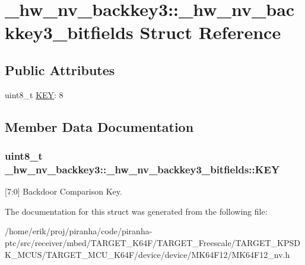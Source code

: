 \hypertarget{struct__hw__nv__backkey3_1_1__hw__nv__backkey3__bitfields}{}\section{\+\_\+hw\+\_\+nv\+\_\+backkey3\+:\+:\+\_\+hw\+\_\+nv\+\_\+backkey3\+\_\+bitfields Struct Reference}
\label{struct__hw__nv__backkey3_1_1__hw__nv__backkey3__bitfields}
\subsection*{Public Attributes}
\begin{DoxyCompactItemize}
\item 
uint8\+\_\+t \hyperlink{struct__hw__nv__backkey3_1_1__hw__nv__backkey3__bitfields_ab9451ab6b31792de74b78db2609ceb9f}{K\+EY}\+: 8
\end{DoxyCompactItemize}


\subsection{Member Data Documentation}
\subsubsection[{\texorpdfstring{K\+EY}{KEY}}]{\setlength{\rightskip}{0pt plus 5cm}uint8\+\_\+t \+\_\+hw\+\_\+nv\+\_\+backkey3\+::\+\_\+hw\+\_\+nv\+\_\+backkey3\+\_\+bitfields\+::\+K\+EY}\hypertarget{struct__hw__nv__backkey3_1_1__hw__nv__backkey3__bitfields_ab9451ab6b31792de74b78db2609ceb9f}{}\label{struct__hw__nv__backkey3_1_1__hw__nv__backkey3__bitfields_ab9451ab6b31792de74b78db2609ceb9f}
\mbox{[}7\+:0\mbox{]} Backdoor Comparison Key. 

The documentation for this struct was generated from the following file\+:\begin{DoxyCompactItemize}
\item 
/home/erik/proj/piranha/code/piranha-\/ptc/src/receiver/mbed/\+T\+A\+R\+G\+E\+T\+\_\+\+K64\+F/\+T\+A\+R\+G\+E\+T\+\_\+\+Freescale/\+T\+A\+R\+G\+E\+T\+\_\+\+K\+P\+S\+D\+K\+\_\+\+M\+C\+U\+S/\+T\+A\+R\+G\+E\+T\+\_\+\+M\+C\+U\+\_\+\+K64\+F/device/device/\+M\+K64\+F12/M\+K64\+F12\+\_\+nv.\+h\end{DoxyCompactItemize}

